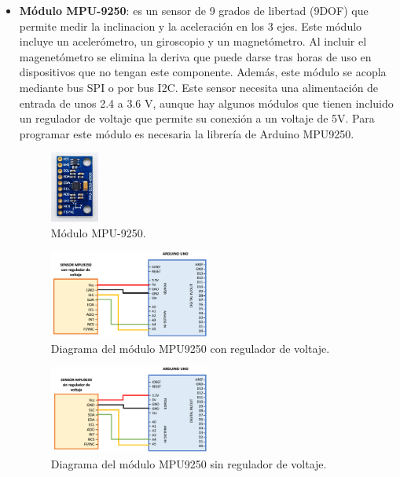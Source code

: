 \begin{itemize}
    \item \textbf{Módulo MPU-9250}\cite{MPU9250_1,MPU9250_2}: es un sensor de 9 grados de libertad (9DOF) que permite medir la inclinacion y la aceleración en los 3 ejes. Este módulo incluye un acelerómetro, un giroscopio y un magnetómetro. Al incluir el magenetómetro se elimina la deriva que puede darse tras horas de uso en dispositivos que no tengan este componente. Además, este módulo se acopla mediante bus SPI o por bus I2C. Este sensor necesita una alimentación de entrada de unos 2.4 a 3.6 V, aunque hay algunos módulos que tienen incluido un regulador de voltaje que permite su conexión a un voltaje de 5V. Para programar este módulo es necesaria la librería de Arduino MPU9250\cite{libMPU9250}. 
\begin{figure}[h!]
    \centering
    \includegraphics[width=0.15\textwidth]{img/imgMPU9250.jpg}
    \caption{Módulo MPU-9250\cite{imgMPU9250}.}
    \label{fig:imgMPU9250} %
\end{figure}

\begin{figure}[h!]
    \centering
    \includegraphics[width=0.5\textwidth]{img/MPU9250Regulador.png}
    \caption{Diagrama del módulo MPU9250 con regulador de voltaje.}
    \label{fig:MPU9250R} %
\end{figure}
\begin{figure}[h!]
    \centering
    \includegraphics[width=0.5\textwidth]{img/MPU9250SinRegulador.png}
    \caption{Diagrama del módulo MPU9250 sin regulador de voltaje.}
    \label{fig:MPU9250} %
\end{figure}

\end{itemize}


